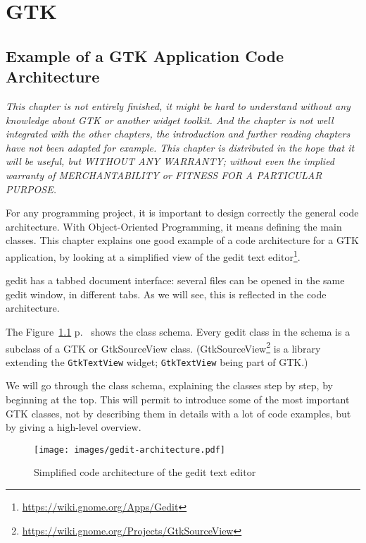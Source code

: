 \part{GTK}
\chapter{Example of a GTK Application Code Architecture}
\label{gtk-app-arch}

\emph{This chapter is not entirely finished, it might be hard to understand without any knowledge about GTK or another widget toolkit. And the chapter is not well integrated with the other chapters, the introduction and further reading chapters have not been adapted for example. This chapter is distributed in the hope that it will be useful, but WITHOUT ANY WARRANTY; without even the implied warranty of MERCHANTABILITY or FITNESS FOR A PARTICULAR PURPOSE.}


For any programming project, it is important to design correctly the general code architecture. With Object-Oriented Programming, it means defining the main classes. This chapter explains one good example of a code architecture for a GTK application, by looking at a simplified view of the gedit text editor\footnote{\url{https://wiki.gnome.org/Apps/Gedit}}.

gedit has a tabbed document interface: several files can be opened in the same gedit window, in different tabs. As we will see, this is reflected in the code architecture.

The Figure~\ref{fig:gedit-architecture} p.~\pageref{fig:gedit-architecture} shows the class schema. Every gedit class in the schema is a subclass of a GTK or GtkSourceView class. (GtkSourceView\footnote{\url{https://wiki.gnome.org/Projects/GtkSourceView}} is a library extending the \lstinline{GtkTextView} widget; \lstinline{GtkTextView} being part of GTK.)

We will go through the class schema, explaining the classes step by step, by beginning at the top. This will permit to introduce some of the most important GTK classes, not by describing them in details with a lot of code examples, but by giving a high-level overview.

\begin{figure}
  \begin{center}
    \texttt{[image: images/gedit-architecture.pdf]}
    \caption{Simplified code architecture of the gedit text editor}
    \label{fig:gedit-architecture}
  \end{center}
\end{figure}

